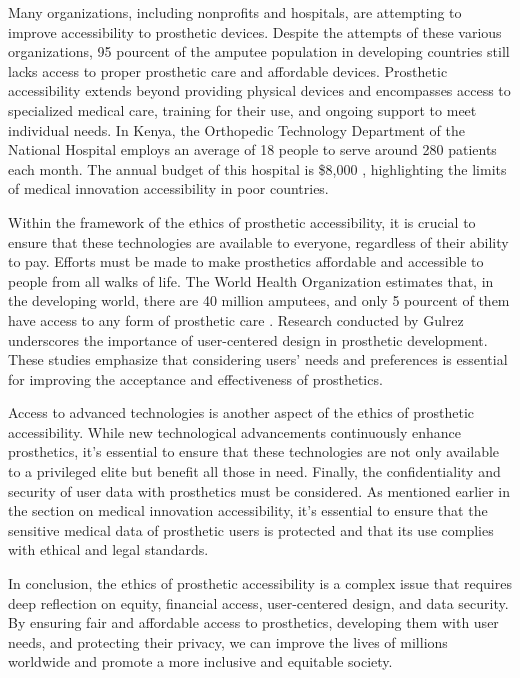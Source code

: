 Many organizations, including nonprofits and hospitals, are attempting to improve accessibility to prosthetic devices. Despite the attempts of these various organizations, 95 pourcent of the amputee population in developing countries still lacks access to proper prosthetic care and affordable devices. Prosthetic accessibility extends beyond providing physical devices and encompasses access to specialized medical care, training for their use, and ongoing support to meet individual needs. In Kenya, the Orthopedic Technology Department of the National Hospital employs an average of 18 people to serve around 280 patients each month. The annual budget of this hospital is \$8,000 \cite{noauthor_access_nodate}, highlighting the limits of medical innovation accessibility in poor countries.

Within the framework of the ethics of prosthetic accessibility, it is crucial to ensure that these technologies are available to everyone, regardless of their ability to pay. Efforts must be made to make prosthetics affordable and accessible to people from all walks of life. The World Health Organization estimates that, in the developing world, there are 40 million amputees, and only 5 pourcent of them have access to any form of prosthetic care \cite{noauthor_why_nodate}. Research conducted by Gulrez \cite{gulrez_hands-free_2016} underscores the importance of user-centered design in prosthetic development. These studies emphasize that considering users' needs and preferences is essential for improving the acceptance and effectiveness of prosthetics.

Access to advanced technologies is another aspect of the ethics of prosthetic accessibility. While new technological advancements continuously enhance prosthetics, it’s essential to ensure that these technologies are not only available to a privileged elite but benefit all those in need.
Finally, the confidentiality and security of user data with prosthetics must be considered. As mentioned earlier in the section on medical innovation accessibility, it’s essential to ensure that the sensitive medical data of prosthetic users is protected and that its use complies with ethical and legal standards.

In conclusion, the ethics of prosthetic accessibility is a complex issue that requires deep reflection on equity, financial access, user-centered design, and data security. By ensuring fair and affordable access to prosthetics, developing them with user needs, and protecting their privacy, we can improve the lives of millions worldwide and promote a more inclusive and equitable society.

